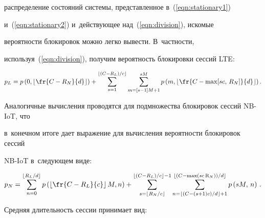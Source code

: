 распределение состояний системы, представленное в~(\ref{eqn:stationary1}) 


и~(\ref{eqn:stationary2}) и~действующее над~(\ref{eqn:division}), искомые 


вероятности блокировок можно легко вывести. В~частности, 


используя~(\ref{eqn:division}), получим вероятность блокировки сессий LTE:


\begin{equation*}


    p_{L}=


    p\left( {0,\left\lfloor {\fr{{C - {R_{N}}}}{d}} \right\rfloor } \right) 


+ \sum\limits_{s = 1}^{\left\lfloor {(C - R_{L})}/{c}


\right\rfloor } \sum\limits_{m = [s - 1]M + 1}^{s M} {p\left( {m,\left\lfloor 


{\fr{{C - \max[s c,\,{R_{N}}]}}{d}} \right\rfloor } \right)} \,.


\end{equation*}





Аналогичные вычисления проводятся для подмножества блокировок сессий NB-IoT, что 


в~конечном итоге дает выражение для вычисления вероятности блокировок сессий 


NB-IoT в~следующем виде:


\begin{equation*}


    p_{N} = \sum\limits_{n = 0}^{\left\lfloor R_L/d 


\right\rfloor } p\left( \left\lfloor {\fr{{C - {R_L}}}{c}} \right\rfloor M,n 


\right) + \sum\limits_{s = \left\lfloor R_N/{c} 


\right\rfloor }^{\left\lfloor (C - {R_L})/{c} \right\rfloor  - 1} 


\sum\limits_{n = \left\lfloor (C - (s + 1)c)/d 


\right\rfloor  +  1}^{\left\lfloor (C - \max({sc}\,\mathrm{R}_N))/d 


\right\rfloor } p\left( {sM,\,n} \right) \,.


\end{equation*}





Средняя длительность сессии принимает вид:


